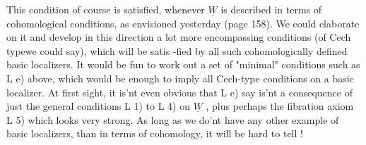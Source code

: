 This condition of course is satisfied, whenever $\underline{W}$ is described in
terms of cohomological conditions, as envisioned yesterday (page 158).
We could elaborate on it and develop in this direction a lot more
encompassing conditions (of \hand{\v{}}Cech typewe could say), which will be satis
-fied by all such cohomologically defined basic localizers. It would be
fun to work out a set of "minimal" conditions such as L e) above, which
would be enough to imply all \hand{\v{}}Cech-type conditions on a basic localizer.
At first sight, it is'nt even obvious that L e) say is'nt a consequence
\margin{$\times$}
of just the general conditions L 1) to L 4) on $\underline{W}$ , plus perhaps the
fibration axiom L 5) which looks very strong. As long as we do'nt have
any other example of basic localizers, than in terms of cohomology, it
will be hard to tell !

